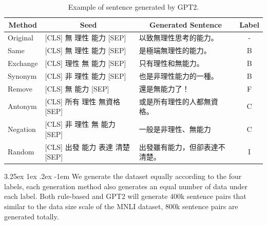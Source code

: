 \documentclass[12pt]{article}
\makeatletter
\renewcommand\paragraph{\@startsection{paragraph}{5}{\z@}%
  {3.25ex \@plus1ex \@minus.2ex}%
  {-1em}%
  {\normalfont\normalsize\bfseries}}
\makeatother
\begin{document}
\begin{CJK*}{UTF8}{bkai}
\begin{spacing}{1.77}
\begin{table}[H]
  \centering
  \setlength{\extrarowheight}{-3pt}
  \begin{tabular}{|l|l|l|c|}
  \hline
  \multicolumn{1}{|c|}{Method} & \multicolumn{1}{c|}{Seed} & \multicolumn{1}{c|}{Generated Sentence} & Label \\ \hline
  Original & {[}CLS{]} 無 理性 能力 {[}SEP{]} & 以致無理性思考的能力。 & - \\ \hline
  Same & {[}CLS{]} 無 理性 能力 {[}SEP{]} & 是極端無理性的能力。 & B \\ \hline
  Exchange & {[}CLS{]} 理性 無 能力 {[}SEP{]} & 只有理性和無能力。 & B \\ \hline
  Synonym & {[}CLS{]} 非 理性 能力 {[}SEP{]} & 也是非理性能力的一種。 & B \\ \hline
  Remove & {[}CLS{]} 無 能力 {[}SEP{]} & 還是無能力了！ & F \\ \hline
  Antonym & {[}CLS{]} 所有 理性 無資格 {[}SEP{]} & 或是所有理性的人都無資格。 & C \\ \hline
  Negation & {[}CLS{]} 非 理性 無 能力 {[}SEP{]} & 一般是非理性、無能力 & C \\ \hline
  Random & {[}CLS{]} 出發 能力 表達 清楚 {[}SEP{]} & 出發雖有能力，但卻表達不清楚。 & I \\ \hline
  \end{tabular}
  \caption{Example of sentence generated by GPT2.}
  \label{example:gpt2_pseudo}
\end{table}

\paragraph{}
We generate the dataset equally according to the four labels, each generation method also generates an equal number of data under each label. Both rule-based and GPT2 will generate 400k sentence pairs that similar to the data size scale of the MNLI dataset, 800k sentence pairs are generated totally.


\end{spacing}
\end{CJK*}
\end{document}
